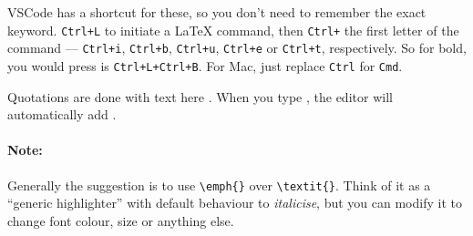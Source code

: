 VSCode has a shortcut for these, so you don't need to remember the exact keyword. \verb|Ctrl+L| to initiate a LaTeX command, then \verb|Ctrl+| the first letter of the command --- \verb|Ctrl+i|, \verb|Ctrl+b|, \verb|Ctrl+u|, \verb|Ctrl+e| or \verb|Ctrl+t|, respectively.
So for bold, you would press is \verb|Ctrl+L+Ctrl+B|.
For Mac, just replace \verb|Ctrl| for \verb|Cmd|.

Quotations are done with \textasciigrave\textasciigrave text here \textquotesingle\textquotesingle.
When you type \textasciigrave, the editor will automatically add \textquotesingle.

\paragraph{Note:} Generally the suggestion is to use \verb|\emph{}| over \verb|\textit{}|.
Think of it as a ``generic highlighter'' with default behaviour to \emph{italicise}, but you can modify it to change font colour, size or anything else.